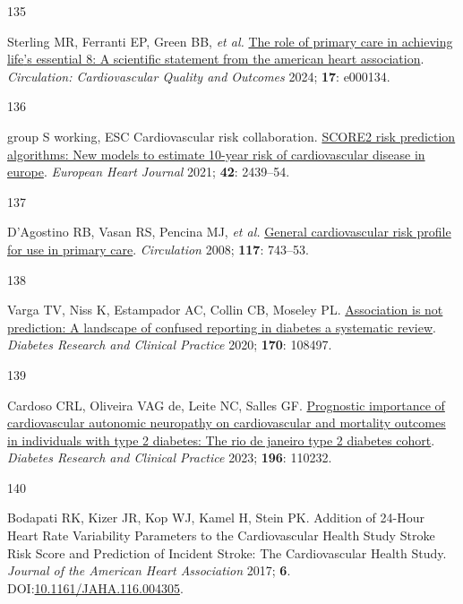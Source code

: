 \documentclass[
  a4paper,
  headsepline=true,
  open=any]{scrbook}
\newlength{\cslhangindent}
\newlength{\csllabelwidth}
\newlength{\cslentryspacingunit} %
\newenvironment{CSLReferences}[2] %
 {%
  \setlength{\parindent}{0pt}
  \ifodd #1
  \let\oldpar\par
  \def\par{\hangindent=\cslhangindent\oldpar}
  \fi
  \setlength{\parskip}{#2\cslentryspacingunit}
 }%
 {}
\newcommand{\CSLLeftMargin}[1]{\parbox[t]{\csllabelwidth}{#1}}
\newcommand{\CSLRightInline}[1]{\parbox[t]{\linewidth - \csllabelwidth}{#1}\break}
\begin{document}
\begin{CSLReferences}{0}{0}
\leavevmode{}%
\CSLLeftMargin{135 }%
\CSLRightInline{Sterling MR, Ferranti EP, Green BB, \emph{et al.}
\href{https://doi.org/10.1161/HCQ.0000000000000134}{The role of primary
care in achieving life{'}s essential 8: A scientific statement from the
american heart association}. \emph{Circulation: Cardiovascular Quality
and Outcomes} 2024; \textbf{17}: e000134.}

\leavevmode{}%
\CSLLeftMargin{136 }%
\CSLRightInline{group S working, ESC Cardiovascular risk collaboration.
\href{https://doi.org/10.1093/eurheartj/ehab309}{SCORE2 risk prediction
algorithms: New models to estimate 10-year risk of cardiovascular
disease in europe}. \emph{European Heart Journal} 2021; \textbf{42}:
2439--54.}

\leavevmode{}%
\CSLLeftMargin{137 }%
\CSLRightInline{D'Agostino RB, Vasan RS, Pencina MJ, \emph{et al.}
\href{https://doi.org/10.1161/CIRCULATIONAHA.107.699579}{General
cardiovascular risk profile for use in primary care}. \emph{Circulation}
2008; \textbf{117}: 743--53.}

\leavevmode{}%
\CSLLeftMargin{138 }%
\CSLRightInline{Varga TV, Niss K, Estampador AC, Collin CB, Moseley PL.
\href{https://doi.org/10.1016/j.diabres.2020.108497}{Association is not
prediction: A landscape of confused reporting in diabetes {\textendash}
a systematic review}. \emph{Diabetes Research and Clinical Practice}
2020; \textbf{170}: 108497.}

\leavevmode{}%
\CSLLeftMargin{139 }%
\CSLRightInline{Cardoso CRL, Oliveira VAG de, Leite NC, Salles GF.
\href{https://doi.org/10.1016/j.diabres.2022.110232}{Prognostic
importance of cardiovascular autonomic neuropathy on cardiovascular and
mortality outcomes in individuals with type 2 diabetes: The rio de
janeiro type 2 diabetes cohort}. \emph{Diabetes Research and Clinical
Practice} 2023; \textbf{196}: 110232.}

\leavevmode{}%
\CSLLeftMargin{140 }%
\CSLRightInline{Bodapati RK, Kizer JR, Kop WJ, Kamel H, Stein PK.
Addition of 24-Hour Heart Rate Variability Parameters to the
Cardiovascular Health Study Stroke Risk Score and Prediction of Incident
Stroke: The Cardiovascular Health Study. \emph{Journal of the American
Heart Association} 2017; \textbf{6}.
DOI:\href{https://doi.org/10.1161/JAHA.116.004305}{10.1161/JAHA.116.004305}.}


\end{CSLReferences}
\end{document}
